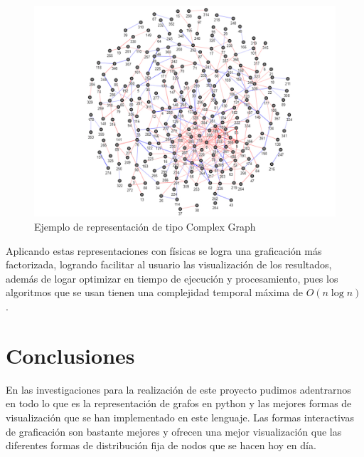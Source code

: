 \documentclass[a4paper,10pt,twocolumn]{article}
\begin{document}
\begin{figure}[h!]%
\includegraphics[scale=0.25]{complex.jpg}
\caption{Ejemplo de representación de tipo Complex Graph}
\end{figure}

Aplicando estas representaciones con físicas se logra una graficación más factorizada, logrando facilitar al usuario las visualización
de los resultados, además de logar optimizar en tiempo de ejecución y procesamiento, pues los algoritmos que se usan tienen una complejidad temporal máxima de $O(n\log{n})$.\\

\section{Conclusiones}\label{sec:conc}

En las investigaciones para la realización de este proyecto pudimos adentrarnos en todo lo que es la representación de grafos en python y las mejores formas de visualización que se han implementado en este lenguaje. Las formas interactivas de graficación son bastante mejores y ofrecen una mejor visualización que las diferentes formas de distribución fija de nodos que se hacen hoy en día.\\



\end{document}

